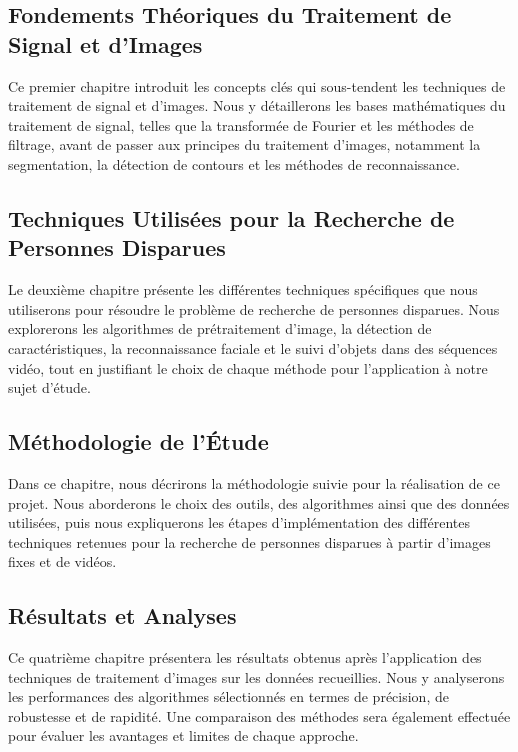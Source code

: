 \documentclass[a4paper,12pt]{report}
\begin{document}
\subsection*{Fondements Théoriques du Traitement de Signal et d’Images}
Ce premier chapitre introduit les concepts clés qui sous-tendent les techniques de traitement de signal et d’images. Nous y détaillerons les bases mathématiques du traitement de signal, telles que la transformée de Fourier et les méthodes de filtrage, avant de passer aux principes du traitement d'images, notamment la segmentation, la détection de contours et les méthodes de reconnaissance.

\subsection*{Techniques Utilisées pour la Recherche de Personnes Disparues}
Le deuxième chapitre présente les différentes techniques spécifiques que nous utiliserons pour résoudre le problème de recherche de personnes disparues. Nous explorerons les algorithmes de prétraitement d'image, la détection de caractéristiques, la reconnaissance faciale et le suivi d'objets dans des séquences vidéo, tout en justifiant le choix de chaque méthode pour l'application à notre sujet d'étude.

\subsection*{Méthodologie de l’Étude}
Dans ce chapitre, nous décrirons la méthodologie suivie pour la réalisation de ce projet. Nous aborderons le choix des outils, des algorithmes ainsi que des données utilisées, puis nous expliquerons les étapes d’implémentation des différentes techniques retenues pour la recherche de personnes disparues à partir d'images fixes et de vidéos.

\subsection*{Résultats et Analyses}
Ce quatrième chapitre présentera les résultats obtenus après l'application des techniques de traitement d'images sur les données recueillies. Nous y analyserons les performances des algorithmes sélectionnés en termes de précision, de robustesse et de rapidité. Une comparaison des méthodes sera également effectuée pour évaluer les avantages et limites de chaque approche.
\end{document}
